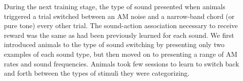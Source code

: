 During the next training stage, the type of sound presented when animals
triggered a trial switched between an AM noise and a narrow-band chord (or pure
tone) every other trial.
%
The sound-action association necessary to receive reward was the same as had
been previously learned for each sound.
%
We first introduced animals to the type of sound switching by presenting only
two examples of each sound type, but then moved on to presenting a range of AM
rates and sound frequencies.
%
Animals took few sessions to learn to switch back and forth between the types 
of stimuli they were categorizing.

